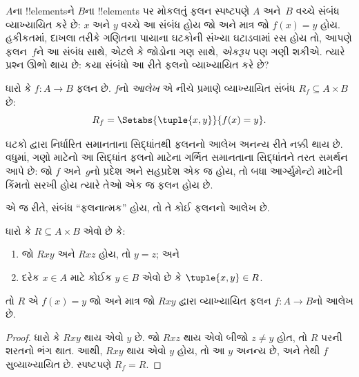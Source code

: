 \documentclass[../../../include/open-logic-section]{subfiles}
\begin{document}


\begin{explain}
$A$ના !!{element}sને $B$ના !!{element}s પર મોકલતું
ફલન સ્પષ્ટપણે $A$ અને~$B$ વચ્ચે સંબંધ વ્યાખ્યાયિત
કરે છે: $x$ અને $y$ વચ્ચે આ સંબંધ હોય જો અને માત્ર જો
$f(x) = y$ હોય. હકીકતમાં, દાખલા તરીકે ગણિતના પાયાના
ઘટકોની સંખ્યા ઘટાડવામાં રસ હોય તો, આપણે ફલન~$f$ને
આ સંબંધ સાથે, એટલે કે જોડોના ગણ સાથે, \emph{એકરૂપ}
પણ ગણી શકીએ. ત્યારે પ્રશ્ન ઊભો થાય છે: કયા સંબંધો
આ રીતે ફલનો વ્યાખ્યાયિત કરે છે?
\end{explain}

\begin{defn}[ફલનનો આલેખ] ધારો કે $f\colon A \to B$
ફલન છે. $f$નો \emph{આલેખ} એ નીચે પ્રમાણે વ્યાખ્યાયિત
સંબંધ $R_f \subseteq A \times B$ છે:
\[
R_f = \Setabs{\tuple{x,y}}{f(x) = y}.
\]
\end{defn}

\begin{explain}
ઘટકો દ્વારા નિર્ધારિત સમાનતાના સિદ્ધાંતથી ફલનનો
આલેખ અનન્ય રીતે નક્કી થાય છે. વધુમાં, ગણો માટેનો
આ સિદ્ધાંત ફલનો માટેના ગર્ભિત સમાનતાના સિદ્ધાંતને
તરત સમર્થન આપે છે: જો $f$ અને~$g$નો પ્રદેશ અને
સહપ્રદેશ એક જ હોય, તો બધા આર્ગ્યુમેન્ટો માટેની કિંમતો
સરખી હોય ત્યારે તેઓ એક જ ફલન હોય છે.

એ જ રીતે, સંબંધ “ફલનાત્મક” હોય, તો તે કોઈ
ફલનનો આલેખ છે.
\end{explain}

\begin{prop}
ધારો કે $R \subseteq A \times B$ એવો છે કે:
\begin{enumerate}
\item જો $Rxy$ અને $Rxz$ હોય, તો $y = z$; અને
\item દરેક $x \in A$ માટે કોઈક $y \in B$ એવો છે
કે $\tuple{x,
y} \in R$.
\end{enumerate}
તો $R$ એ $f(x) = y$ જો અને માત્ર જો $Rxy$
દ્વારા વ્યાખ્યાયિત ફલન $f\colon A \to B$નો આલેખ છે.
\end{prop}

\begin{proof}
ધારો કે $Rxy$ થાય એવો $y$ છે. જો $Rxz$ થાય એવો
બીજો $z \neq
y$ હોત, તો $R$ પરની શરતનો ભંગ થાત.
આથી, $Rxy$ થાય એવો $y$ હોય, તો આ $y$ અનન્ય છે,
અને તેથી $f$ સુવ્યાખ્યાયિત છે. સ્પષ્ટપણે $R_f = R$.
\end{proof}
\end{document}
